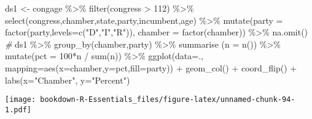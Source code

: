 \documentclass[
]{book}
\newenvironment{Shaded}{\begin{snugshade}}{\end{snugshade}}
\newcommand{\AttributeTok}[1]{\textcolor[rgb]{0.77,0.63,0.00}{#1}}
\newcommand{\CommentTok}[1]{\textcolor[rgb]{0.56,0.35,0.01}{\textit{#1}}}
\newcommand{\DecValTok}[1]{\textcolor[rgb]{0.00,0.00,0.81}{#1}}
\newcommand{\FunctionTok}[1]{\textcolor[rgb]{0.00,0.00,0.00}{#1}}
\newcommand{\NormalTok}[1]{#1}
\newcommand{\OtherTok}[1]{\textcolor[rgb]{0.56,0.35,0.01}{#1}}
\newcommand{\SpecialCharTok}[1]{\textcolor[rgb]{0.00,0.00,0.00}{#1}}
\newcommand{\StringTok}[1]{\textcolor[rgb]{0.31,0.60,0.02}{#1}}
\begin{document}
\begin{Shaded}
\begin{Highlighting}[]
\NormalTok{ds1 }\OtherTok{\textless{}{-}}\NormalTok{ congage }\SpecialCharTok{\%\textgreater{}\%} \FunctionTok{filter}\NormalTok{(congress }\SpecialCharTok{\textgreater{}} \DecValTok{112}\NormalTok{) }\SpecialCharTok{\%\textgreater{}\%} \FunctionTok{select}\NormalTok{(congress,chamber,state,party,incumbent,age) }\SpecialCharTok{\%\textgreater{}\%}
 \FunctionTok{mutate}\NormalTok{(}\AttributeTok{party =} \FunctionTok{factor}\NormalTok{(party,}\AttributeTok{levels=}\FunctionTok{c}\NormalTok{(}\StringTok{"D"}\NormalTok{,}\StringTok{"I"}\NormalTok{,}\StringTok{"R"}\NormalTok{)),}
        \AttributeTok{chamber =} \FunctionTok{factor}\NormalTok{(chamber)) }\SpecialCharTok{\%\textgreater{}\%} 
  \FunctionTok{na.omit}\NormalTok{()}
\CommentTok{\#}
\NormalTok{ds1 }\SpecialCharTok{\%\textgreater{}\%} \FunctionTok{group\_by}\NormalTok{(chamber,party)  }\SpecialCharTok{\%\textgreater{}\%}
   \FunctionTok{summarise}\NormalTok{ (}\AttributeTok{n =} \FunctionTok{n}\NormalTok{()) }\SpecialCharTok{\%\textgreater{}\%}
  \FunctionTok{mutate}\NormalTok{(}\AttributeTok{pct =} \DecValTok{100}\SpecialCharTok{*}\NormalTok{n }\SpecialCharTok{/} \FunctionTok{sum}\NormalTok{(n)) }\SpecialCharTok{\%\textgreater{}\%}
\FunctionTok{ggplot}\NormalTok{(}\AttributeTok{data=}\NormalTok{., }\AttributeTok{mapping=}\FunctionTok{aes}\NormalTok{(}\AttributeTok{x=}\NormalTok{chamber,}\AttributeTok{y=}\NormalTok{pct,}\AttributeTok{fill=}\NormalTok{party)) }\SpecialCharTok{+} 
  \FunctionTok{geom\_col}\NormalTok{() }\SpecialCharTok{+}
  \FunctionTok{coord\_flip}\NormalTok{() }\SpecialCharTok{+}
  \FunctionTok{labs}\NormalTok{(}\AttributeTok{x=}\StringTok{"Chamber"}\NormalTok{, }\AttributeTok{y=}\StringTok{"Percent"}\NormalTok{)}
\end{Highlighting}
\end{Shaded}

\texttt{[image: bookdown-R-Essentials\_files/figure-latex/unnamed-chunk-94-1.pdf]}

  
\end{document}
